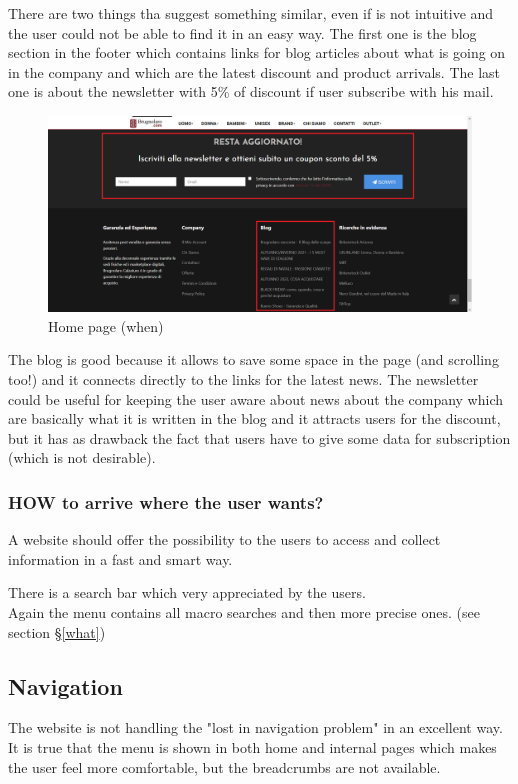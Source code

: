 There are two things tha suggest something similar, even if is not intuitive and the user
could not be able to find it in an easy way.
The first one is the blog section in the footer which contains links for blog articles about
what is going on in the company and which are the latest discount and product arrivals.
The last one is about the newsletter with 5\% of discount if user subscribe with his mail.
\begin{figure}[!h] 
    \centering 
    \includegraphics[scale = 0.29]{images/when.png} 
    \caption{Home page (when)}
    \label{home-page-when}
\end{figure}
\newline
The blog is good because it allows to save some space in the page (and scrolling too!) and
it connects directly to the links for the latest news.
The newsletter could be useful for keeping the user aware about news about the company which
are basically what it is written in the blog and it attracts users for the discount, but it has
as drawback the fact that users have to give some data for subscription (which is not desirable).

\subsubsection{HOW to arrive where the user wants?}
A website should offer the possibility to the users to access
and collect information in a fast and smart way.

There is a search bar which very appreciated by the users.\\
Again the menu contains all macro searches and then more precise ones. (see section §\ref{what})

\subsection{Navigation}
The website is not handling the "lost in navigation problem" in an excellent way.
It is true that the menu is shown in both home and internal pages which makes
the user feel more comfortable, but the breadcrumbs are not available.\\

